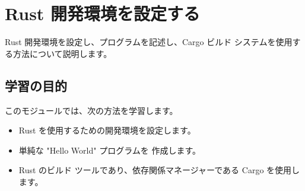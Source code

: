 \section{Rust 開発環境を設定する}

Rust 開発環境を設定し、プログラムを記述し、Cargo ビルド システムを使用する方法について説明します。

\subsection{学習の目的}

このモジュールでは、次の方法を学習します。

\begin{itemize}
\item Rust を使用するための開発環境を設定します。
\item 単純な "Hello World" プログラムを 作成します。
\item Rust のビルド ツールであり、依存関係マネージャーである Cargo を使用します。
\end{itemize}




